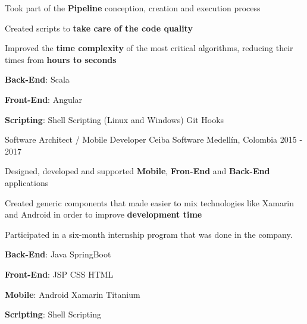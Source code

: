 \begin{cventries}
{\begin{cvitems}
        \item {Took part of the \textbf{Pipeline} conception, creation and execution process}
        \item {Created scripts to \textbf{take care of the code quality}}
        \item {Improved the \textbf{time complexity} of the most critical algorithms, reducing their times from \textbf{hours to seconds}}
        \item {\textbf{Back-End}: Scala {\dotsep} }
        \item {\textbf{Front-End}: Angular {\dotsep} }
        \item {\textbf{Scripting}: Shell Scripting (Linux and Windows){\dotsep}  {\dotsep} Git Hooks  {\dotsep} }
      \end{cvitems}
      \begin{cvsubentries}
      \end{cvsubentries}
    }
  \cventry
    {Software Architect / Mobile Developer}
    {Ceiba Software}
    {Medellín, Colombia}
    {2015 - 2017}
    {
      \begin{cvitems}
        \item {Designed, developed and supported \textbf{Mobile}, \textbf{Fron-End} and \textbf{Back-End} applications}
        \item {Created generic components that made easier to mix technologies like Xamarin and Android in order to improve \textbf{development time}}
        \item {Participated in a six-month internship program that was done in the company.}
        \item {\textbf{Back-End}: Java {\dotsep}  {\dotsep} SpringBoot {\dotsep} }
        \item {\textbf{Front-End}: JSP {\dotsep} CSS {\dotsep}  {\dotsep} HTML {\dotsep} }
        \item {\textbf{Mobile}: Android {\dotsep}  {\dotsep} Xamarin {\dotsep} Titanium}
        \item {\textbf{Scripting}: Shell Scripting {\dotsep} }
      \end{cvitems}
      \begin{cvsubentries}

\end{cvsubentries}}
\end{cventries}
